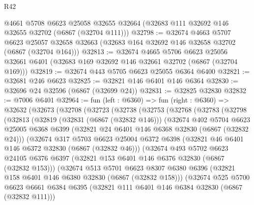 \begin{lexlean}{R42}
\begin{coremodule}
{    @4661
    @5708
    @6623
    @25058
    @32655
    @32664
    (@32683 @111 @32692 @146 @32655 @32702 (@6867 (@32704 @111)))
@32798 := @32674
    @4663
    @5707
    @6623
    @25057
    @32658
    @32663
    (@32683 @164 @32692 @146 @32658 @32702 (@6867 (@32704 @164)))
@32813 := @32674
    @4665
    @5706
    @6623
    @25056
    @32661
    @6401
    (@32683 @169 @32692 @146 @32661 @32702 (@6867 (@32704 @169)))
@32819 := @32674 @443 @5705 @6623 @25055 @6364 @6400
@32821 := @32681 @246 @6623
@32825 := @32821 @146 @6401 @146 @6364
@32830 := @32696 @24 @32596 (@6867 (@32699 @24))
@32831 := @32825 @32830
@32832 := @7006 @6401
@32964 := fun (left : @6360) =>
  fun (right : @6360) =>
  @32632
    (@32673
      (@32708
        (@32723
          (@32738
            (@32753
              (@32768
                (@32783
                  (@32798
                    (@32813
                      (@32819
                        (@32831 (@6867 (@32832 @146)))
                        (@32674
                          @402
                          @5704
                          @6623
                          @25005
                          @6368
                          @6399
                          (@32821 @24 @6401 @146 @6368 @32830 (@6867 (@32832 @24)))
                          (@32674
                            @317
                            @5703
                            @6623
                            @25004
                            @6372
                            @6398
                            (@32821 @46 @6401 @146 @6372 @32830 (@6867 (@32832 @46)))
                            (@32674
                              @493
                              @5702
                              @6623
                              @24105
                              @6376
                              @6397
                              (@32821 @153 @6401 @146 @6376 @32830 (@6867 (@32832 @153)))
                              (@32674
                                @513
                                @5701
                                @6623
                                @8307
                                @6380
                                @6396
                                (@32821 @158 @6401 @146 @6380 @32830 (@6867 (@32832 @158)))
                                (@32674
                                  @525
                                  @5700
                                  @6623
                                  @6661
                                  @6384
                                  @6395
                                  (@32821 @111 @6401 @146 @6384 @32830 (@6867 (@32832 @111)))
}
\end{coremodule}
\end{lexlean}
